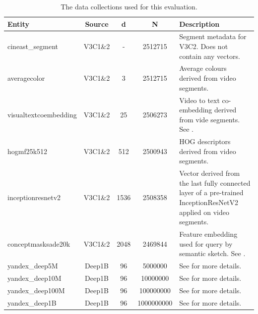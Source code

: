 \begin{table}
    \begin{tabular}{ | l | c | c | c | p{5cm} |}
        \hline
        \textbf{Entity} & \textbf{Source} & \textbf{d} & \textbf{N} & \textbf{Description} \\
        \hline
        \hline
        cineast\_segment & V3C1\&2  & - & 2512715 & Segment metadata for V3C2. Does not contain any vectors. \\ 
        \hline
        averagecolor & V3C1\&2  & 3 & 2512715 & Average colours derived from video segments. \\ 
        \hline
        visualtextcoembedding & V3C1\&2 & 25 & 2506273 & Video to text co-embedding derived from vide segments. See \cite{Spiess:2021Competitive}. \\
        \hline
        hogmf25k512  & V3C1\&2  & 512 & 2500943 & HOG \cite{Bay:2006surf} descriptors derived from video segments. \\
        \hline
        inceptionresnetv2 & V3C1\&2  & 1536 & 2508358 & Vector derived from the last fully connected layer of a pre-trained InceptionResNetV2 applied on video segments.\\
        \hline
        conceptmasksade20k & V3C1\&2 & 2048 & 2469844 & Feature embedding used for query by semantic sketch. See \cite{Rossetto:2019Query}. \\
        \hline
        yandex\_deep5M  & Deep1B  & 96 & 5000000 & See \cite{Babenko:2016Efficient} for more details. \\
        \hline
        yandex\_deep10M  & Deep1B & 96 & 10000000 & See \cite{Babenko:2016Efficient} for more details. \\
        \hline
        yandex\_deep100M  & Deep1B & 96 & 100000000 & See \cite{Babenko:2016Efficient} for more details. \\
        \hline
        yandex\_deep1B  & Deep1B & 96 & 1000000000 & See \cite{Babenko:2016Efficient} for more details. \\
        \hline
        \hline
    \end{tabular}
    \caption{The data collections used for this evaluation. }
    \label{table:datasets}
\end{table}

